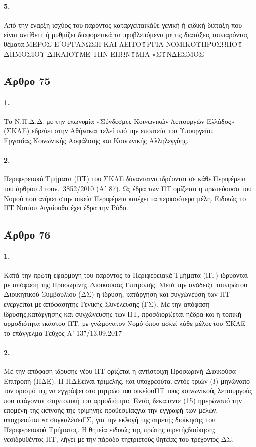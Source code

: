 \documentclass[a4paper,oneside, 10pt]{book}
\begin{document}
\paragraph { 5. } Από την έναρξη ισχύος του παρόντος καταργείταικάθε γενική ή ειδική διάταξη που είναι αντίθετη ή ρυθμίζει διαφορετικά τα προβλεπόμενα με τις διατάξεις τουπαρόντος θέματα.ΜΕΡΟΣ Ε΄ΟΡΓΑΝΩΣΗ ΚΑΙ ΛΕΙΤΟΥΡΓΙΑ ΝΟΜΙΚΟΥΠΡΟΣΩΠΟΥ ΔΗΜΟΣΙΟΥ ΔΙΚΑΙΟΥΜΕ ΤΗΝ ΕΠΩΝΥΜΙΑ «ΣΥΝΔΕΣΜΟΣ
\subsection*{ Άρθρο 75 }
\paragraph { 1. } Το Ν.Π.Δ.Δ. με την επωνυμία «Σύνδεσμος Κοινωνικών Λειτουργών Ελλάδος» (ΣΚΛΕ) εδρεύει στην Αθήνακαι τελεί υπό την εποπτεία του Υπουργείου Εργασίας,Κοινωνικής Ασφάλισης και Κοινωνικής Αλληλεγγύης.
\paragraph { 2. } Περιφερειακά Τμήματα (ΠΤ) του ΣΚΛΕ δύνανταινα ιδρύονται σε κάθε Περιφέρεια του άρθρου 3 τουν. 3852/2010 (Α΄ 87). Ως έδρα των ΠΤ ορίζεται η πρωτεύουσα του Νομού που ανήκει στην οικεία Περιφέρεια καιέχει τα περισσότερα μέλη. Ειδικώς το ΠΤ Νοτίου Αιγαίουθα έχει έδρα την Ρόδο.
\subsection*{ Άρθρο 76 }
\paragraph { 1. } Κατά την πρώτη εφαρμογή του παρόντος τα Περιφερειακά Τμήματα (ΠΤ) ιδρύονται με απόφαση της Προσωρινής Διοικούσας Επιτροπής. Μετά την ανάδειξη τουπρώτου Διοικητικού Συμβουλίου (ΔΣ) η ίδρυση, κατάργηση και συγχώνευση των ΠΤ ενεργείται με απόφασητης Γενικής Συνέλευσης (ΓΣ). Με την απόφαση ίδρυσης,κατάργησης και συγχώνευσης των ΠΤ, προσδιορίζεται ηέδρα και η τοπική αρμοδιότητα εκάστου ΠΤ, με γνώμονατον Νομό όπου ασκεί κάθε μέλος του ΣΚΛΕ το επάγγελμα.Τεύχος Α’ 137/13.09.2017
\paragraph { 2. } Με την απόφαση ίδρυσης νέου ΠΤ ορίζεται η αντίστοιχη Προσωρινή Διοικούσα Επιτροπή (ΠΔΕ). Η ΠΔΕείναι τριμελής, και υποχρεούται εντός τριών (3) μηνώναπό τον ορισμό της να εγγράψει στο μητρώο του οικείουΠΤ τους κοινωνικούς λειτουργούς που υπάγονται στηντοπική του αρμοδιότητα. Εντός δεκαπέντε (15) ημερώναπό την επομένη της εκπνοής της τρίμηνης προθεσμίαςγια την εγγραφή των μελών, υποχρεούται να συγκαλέσειΓΣ, για την εκλογή της αιρετής διοίκησης του Περιφερειακού Τμήματος. Η θητεία ειδικώς της πρώτης αιρετήςδιοίκησης νεοϊδρυθέντος ΠΤ, λήγει με την πάροδο τηςτριετούς θητείας του τρέχοντος ΔΣ.
\end{document}
